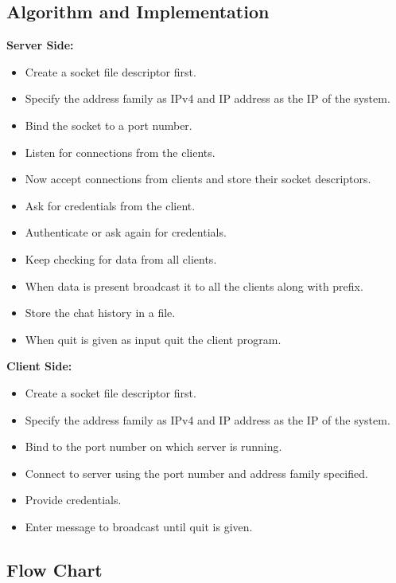 \documentclass[12pt]{article}
\begin{document}
		\subsection{Algorithm and Implementation~\cite{1}~\cite{2}~\cite{3}}
			\textbf{Server Side:}
			\begin{itemize}
				\item Create a socket file descriptor first.
				\item Specify the address family as IPv4 and IP address as the IP of the system.
				\item Bind the socket to a port number.
				\item Listen for connections from the clients.
				\item Now accept connections from clients and store their socket descriptors.
				\item Ask for credentials from the client.
				\item Authenticate or ask again for credentials.
				\item Keep checking for data from all clients.
				\item When data is present broadcast it to all the clients along with prefix.
				\item Store the chat history in a file.
				\item When quit is given as input quit the client program.
			\end{itemize}
			\textbf{Client Side:}
			\begin{itemize}
				\item Create a socket file descriptor first.
				\item Specify the address family as IPv4 and IP address as the IP of the system.
				\item Bind to the port number on which server is running.
				\item Connect to server using the port number and address family specified.
				\item Provide credentials.
				\item Enter message to broadcast until quit is given.

			\end{itemize}			
		\newpage
		\subsection{Flow Chart}
		
\end{document}
